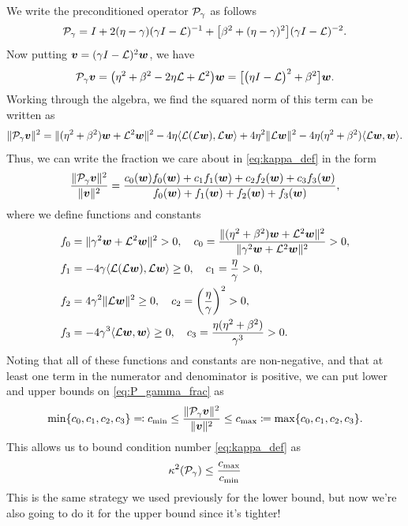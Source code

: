 \documentclass[a4paper,10pt]{article}
\begin{document}
We write the preconditioned operator ${\cal P}_{\gamma}$ as follows
\begin{align*}
{\cal P}_{\gamma} = I + 2(\eta - \gamma) (\gamma I - {\cal L})^{-1} + \big[ \beta^2 + (\eta - \gamma)^2 \big] (\gamma I - {\cal L})^{-2}.
\end{align*}
Now putting $\bm{v} = (\gamma I - {\cal L})^{2} \bm{w}$, we have
\begin{align*}
{\cal P}_{\gamma} \bm{v} = \big( \eta^2 + \beta^2 - 2\eta{\cal L} + {\cal L}^2 \big) \bm{w} = \big[ \big( \eta I - {\cal L} \big)^2 +  \beta^2 \big] \bm{w}.
\end{align*}
Working through the algebra, we find the squared norm of this term can be written as
\begin{align*}
\Vert {\cal P}_{\gamma} \bm{v} \Vert^2
=
\Vert (\eta^2 + \beta^2) \bm{w} + {\cal L}^2 \bm{w} \Vert^2  - 4 \eta \langle {\cal L}({\cal L} \bm{w}), {\cal L}\bm{w} \rangle + 4 \eta^2 \Vert {\cal L} \bm{w} \Vert^2 - 4 \eta (\eta^2 +\beta^2) \langle {\cal L} \bm{w}, \bm{w} \rangle.
\end{align*}
Thus, we can write the fraction we care about in \eqref{eq:kappa_def} in the form
\begin{align}
\label{eq:P_gamma_frac}
\frac{\Vert {\cal P}_{\gamma} \bm{v} \Vert^2}{\Vert \bm{v} \Vert^2}
=
\frac{
c_0(\bm{w}) f_0(\bm{w}) + c_1 f_1(\bm{w}) + c_2 f_2(\bm{w}) + c_3 f_3(\bm{w})
}
{
f_0(\bm{w}) + f_1(\bm{w}) + f_2(\bm{w}) + f_3(\bm{w})
},
\end{align}
where we define functions and constants
\begin{align*}
f_0 &= \Vert \gamma^2 \bm{w} + {\cal L}^2 \bm{w} \Vert^2 > 0,
\quad
c_0 = \frac{\Vert (\eta^2 + \beta^2) \bm{w} + {\cal L}^2 \bm{w} \Vert^2}{\Vert \gamma^2 \bm{w} + {\cal L}^2 \bm{w} \Vert^2} > 0,
\\
f_1 &= -4 \gamma \langle {\cal L}({\cal L} \bm{w}), {\cal L} \bm{w} \rangle \geq 0,
\quad 
c_1 = \frac{\eta}{\gamma} > 0,\\
f_2 &= 4 \gamma^2 \Vert {\cal L} \bm{w} \Vert^2 \geq 0, 
\quad
c_2 = \left( \frac{\eta}{\gamma} \right)^2 > 0, \\
f_3 &= -4 \gamma^3 \langle {\cal L} \bm{w}, \bm{w} \rangle \geq 0, 
\quad
c_3 = \frac{\eta (\eta^2 + \beta^2)}{\gamma^3} > 0.
\end{align*}
Noting that all of these functions and constants are non-negative, and that at least one term in the numerator and denominator is positive, we can put lower and upper bounds on \eqref{eq:P_gamma_frac} as
\begin{align}
\min \{ c_0, c_1, c_2, c_3 \} \eqqcolon c_{\min}
\leq
\frac{\Vert {\cal P}_{\gamma} \bm{v} \Vert^2}{\Vert \bm{v} \Vert^2} 
\leq c_{\max} 
\coloneqq \max \{ c_0, c_1, c_2, c_3 \}.
\end{align}
This allows us to bound condition number \eqref{eq:kappa_def} as
\begin{align} \label{eq:kappa_sq_bound}
\kappa^2({\cal P}_{\gamma}) \leq \frac{c_{\max}}{c_{\min}}
\end{align}
This is the same strategy we used previously for the lower bound, but now we're also going to do it for the upper bound since it's tighter!\\
\end{document}
